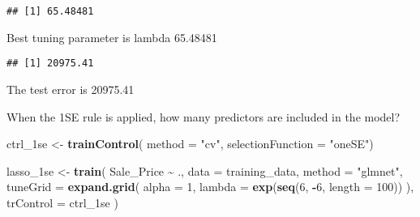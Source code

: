 \documentclass[
]{article}
\newenvironment{Shaded}{\begin{snugshade}}{\end{snugshade}}
\newcommand{\AttributeTok}[1]{\textcolor[rgb]{0.13,0.29,0.53}{#1}}
\newcommand{\DecValTok}[1]{\textcolor[rgb]{0.00,0.00,0.81}{#1}}
\newcommand{\FunctionTok}[1]{\textcolor[rgb]{0.13,0.29,0.53}{\textbf{#1}}}
\newcommand{\NormalTok}[1]{#1}
\newcommand{\OtherTok}[1]{\textcolor[rgb]{0.56,0.35,0.01}{#1}}
\newcommand{\SpecialCharTok}[1]{\textcolor[rgb]{0.81,0.36,0.00}{\textbf{#1}}}
\newcommand{\StringTok}[1]{\textcolor[rgb]{0.31,0.60,0.02}{#1}}
\begin{document}
\begin{Shaded}
\end{Shaded}

\begin{verbatim}
## [1] 65.48481
\end{verbatim}

Best tuning parameter is lambda 65.48481

\begin{Shaded}
\end{Shaded}

\begin{verbatim}
## [1] 20975.41
\end{verbatim}

The test error is 20975.41

When the 1SE rule is applied, how many predictors are included in the
model?

\begin{Shaded}
\begin{Highlighting}[]
\NormalTok{ctrl\_1se }\OtherTok{\textless{}{-}} \FunctionTok{trainControl}\NormalTok{(}
  \AttributeTok{method =} \StringTok{"cv"}\NormalTok{,}
  \AttributeTok{selectionFunction =} \StringTok{"oneSE"}\NormalTok{) }
\end{Highlighting}
\end{Shaded}

\begin{Shaded}
\begin{Highlighting}[]
\NormalTok{lasso\_1se }\OtherTok{\textless{}{-}} \FunctionTok{train}\NormalTok{(}
\NormalTok{  Sale\_Price }\SpecialCharTok{\textasciitilde{}}\NormalTok{ .,}
  \AttributeTok{data =}\NormalTok{ training\_data,}
  \AttributeTok{method =} \StringTok{"glmnet"}\NormalTok{,}
  \AttributeTok{tuneGrid =} \FunctionTok{expand.grid}\NormalTok{(}
    \AttributeTok{alpha =} \DecValTok{1}\NormalTok{,}
    \AttributeTok{lambda =} \FunctionTok{exp}\NormalTok{(}\FunctionTok{seq}\NormalTok{(}\DecValTok{6}\NormalTok{, }\SpecialCharTok{{-}}\DecValTok{6}\NormalTok{, }\AttributeTok{length =} \DecValTok{100}\NormalTok{))  }
\NormalTok{  ),}
  \AttributeTok{trControl =}\NormalTok{ ctrl\_1se}
\NormalTok{)}
\end{Highlighting}
\end{Shaded}
\end{document}
